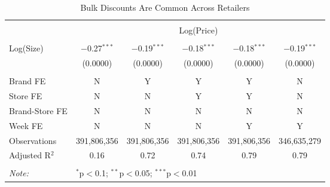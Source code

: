 
\begin{table}[!htbp] \centering
  \caption{Bulk Discounts Are Common Across Retailers}
  \label{tab:bulkDiscountScanner}
\begin{tabular}{@{\extracolsep{5pt}}lccccc}
\\[-1.8ex]\hline
\hline \\[-1.8ex]
 & \multicolumn{5}{c}{Log(Price)} \\
\cline{2-6}
\hline \\[-1.8ex]
Log(Size)       & $-$0.27$^{***}$ & $-$0.19$^{***}$ & $-$0.18$^{***}$ & $-$0.18$^{***}$ & $-$0.19$^{***}$ \\
                 & (0.0000)       & (0.0000)        & (0.0000)        & (0.0000)        & (0.0000)        \\
 \hline \\[-1.8ex]
Brand FE         & N               & Y                 & Y               & Y            & N \\
Store FE         & N               & N                 & Y               & Y            & N\\
Brand-Store FE   & N               & N                 & N               & N            & N \\
Week FE          & N               & N                 & N               & Y            & Y \\
Observations     & 391,806,356     & 391,806,356       & 391,806,356     & 391,806,356  & 346,635,279 \\
Adjusted R$^{2}$ & 0.16            & 0.72              & 0.74            & 0.79         & 0.79 \\
\hline
\hline \\[-1.8ex]
\textit{Note:}  & \multicolumn{5}{l}{$^{*}$p$<$0.1; $^{**}$p$<$0.05; $^{***}$p$<$0.01} \\
\end{tabular}
\end{table}
